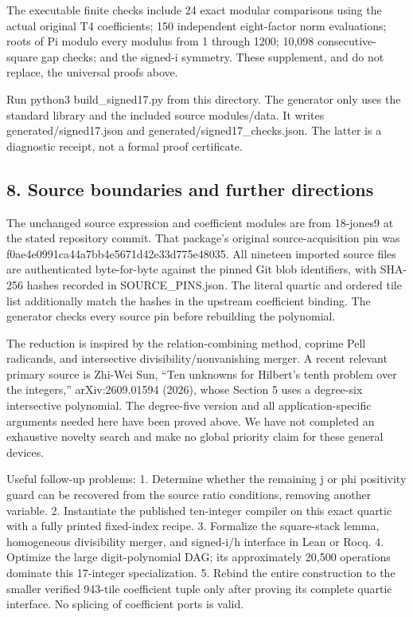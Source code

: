 The executable finite checks include 24 exact modular comparisons using
the actual original T4 coefficients; 150 independent eight-factor norm
evaluations; roots of Pi modulo every modulus from 1 through 1200;
10,098 consecutive-square gap checks; and the signed-i symmetry. These
supplement, and do not replace, the universal proofs above.

Run python3 build\_signed17.py from this directory. The generator only
uses the standard library and the included source modules/data. It
writes generated/signed17.json and generated/signed17\_checks.json. The
latter is a diagnostic receipt, not a formal proof certificate.

\hypertarget{source-boundaries-and-further-directions}{%
\subsection{8. Source boundaries and further
directions}\label{source-boundaries-and-further-directions}}

The unchanged source expression and coefficient modules are from
18-jones9 at the stated repository commit. That package's original
source-acquisition pin was f0ae4e0991ca44a7bb4e5671d42e33d775e48035. All
nineteen imported source files are authenticated byte-for-byte against
the pinned Git blob identifiers, with SHA-256 hashes recorded in
SOURCE\_PINS.json. The literal quartic and ordered tile list
additionally match the hashes in the upstream coefficient binding. The
generator checks every source pin before rebuilding the polynomial.

The reduction is inspired by the relation-combining method, coprime Pell
radicands, and intersective divisibility/nonvanishing merger. A recent
relevant primary source is Zhi-Wei Sun, ``Ten unknowns for Hilbert's
tenth problem over the integers,'' arXiv:2609.01594 (2026), whose
Section 5 uses a degree-six intersective polynomial. The degree-five
version and all application-specific arguments needed here have been
proved above. We have not completed an exhaustive novelty search and
make no global priority claim for these general devices.

Useful follow-up problems: 1. Determine whether the remaining j or phi
positivity guard can be recovered from the source ratio conditions,
removing another variable. 2. Instantiate the published ten-integer
compiler on this exact quartic with a fully printed fixed-index recipe.
3. Formalize the square-stack lemma, homogeneous divisibility merger,
and signed-i/h interface in Lean or Rocq. 4. Optimize the large
digit-polynomial DAG; its approximately 20,500 operations dominate this
17-integer specialization. 5. Rebind the entire construction to the
smaller verified 943-tile coefficient tuple only after proving its
complete quartic interface. No splicing of coefficient ports is valid.
